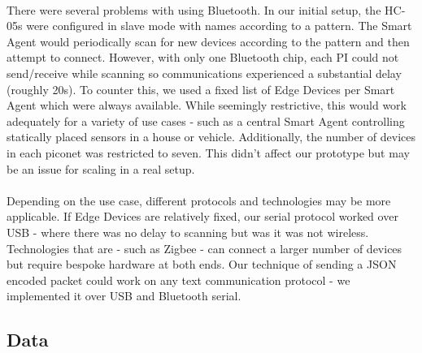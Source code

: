 \paragraph{}
There were several problems with using Bluetooth. In our initial setup, the HC-05s were configured in slave mode with names according to a pattern. The Smart Agent would periodically scan for new devices according to the pattern and then attempt to connect. However, with only one Bluetooth chip, each PI could not send/receive while scanning so communications experienced a substantial delay (roughly 20s). To counter this, we used a fixed list of Edge Devices per Smart Agent which were always available. While seemingly restrictive, this would work adequately for a variety of use cases - such as a central Smart Agent controlling statically placed sensors in a house or vehicle. Additionally, the number of devices in each piconet was restricted to seven. This didn't affect our prototype but may be an issue for scaling in a real setup.

\paragraph{}
Depending on the use case, different protocols and technologies may be more applicable. If Edge Devices are relatively fixed, our serial protocol worked over USB - where there was no delay to scanning but was it was not wireless. Technologies that are - such as Zigbee - can connect a larger number of devices but require bespoke hardware at both ends. Our technique of sending a JSON encoded packet could work on any text communication protocol - we implemented it over USB and Bluetooth serial.



\subsection{Data}

